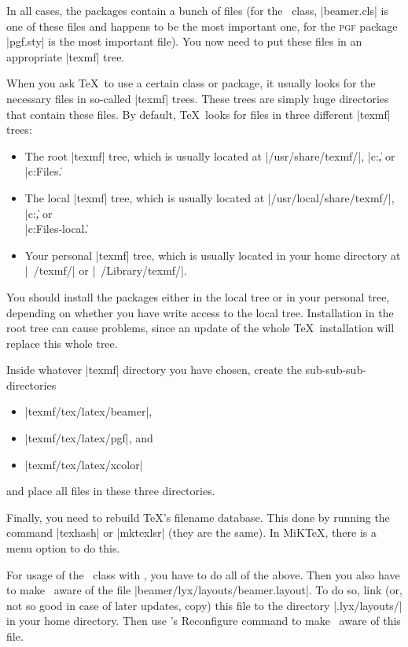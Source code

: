 In all cases, the packages contain a bunch of files (for the \beamer\
class, |beamer.cls| is one of these files and happens to be the
most important one, for the \textsc{pgf} package |pgf.sty| is
the most important file). You now need to put these files in an
appropriate |texmf| tree. 

When you ask \TeX\ to use a certain class or package, it usually looks
for the necessary files in so-called |texmf| trees. These trees
are simply huge directories that contain these files. By default,
\TeX\ looks for files in three different |texmf| trees:
\begin{itemize}
\item
  The root |texmf| tree, which is usually located at
  |/usr/share/texmf/|, |c:\texmf\|, or\\
  |c:\Program Files\TeXLive\texmf\|.
\item
  The local  |texmf| tree, which is usually located at
  |/usr/local/share/texmf/|, |c:\localtexmf\|, or\\
  |c:\Program Files\TeXLive\texmf-local\|.
\item
  Your personal  |texmf| tree, which is usually located in your home
  directory at |~/texmf/| or |~/Library/texmf/|.   
\end{itemize}

You should install the packages either in the local tree or in
your personal tree, depending on whether you have write access to the
local tree. Installation in the root tree can cause problems, since an
update of the whole \TeX\ installation will replace this whole tree.

Inside whatever |texmf| directory you have chosen, create
the sub-sub-sub-directories
\begin{itemize}
\item
  |texmf/tex/latex/beamer|,
\item
  |texmf/tex/latex/pgf|, and
\item
  |texmf/tex/latex/xcolor|
\end{itemize}
and place all files in these three directories.

Finally, you need to rebuild \TeX's filename database. This done by
running the command  |texhash| or |mktexlsr| (they are
the same). In MiK\TeX, there is a menu option to do this.

\lyxnote
For usage of the \beamer\ class with \LyX, you have to do all of the
above. Then you also have to make \LyX\ aware of the file
|beamer/lyx/layouts/beamer.layout|. To do so, link (or, not
so good in case of later updates, copy) this file to the directory
|.lyx/layouts/| in your home directory. Then use \LyX's Reconfigure
command to make \LyX\ aware of this file.

